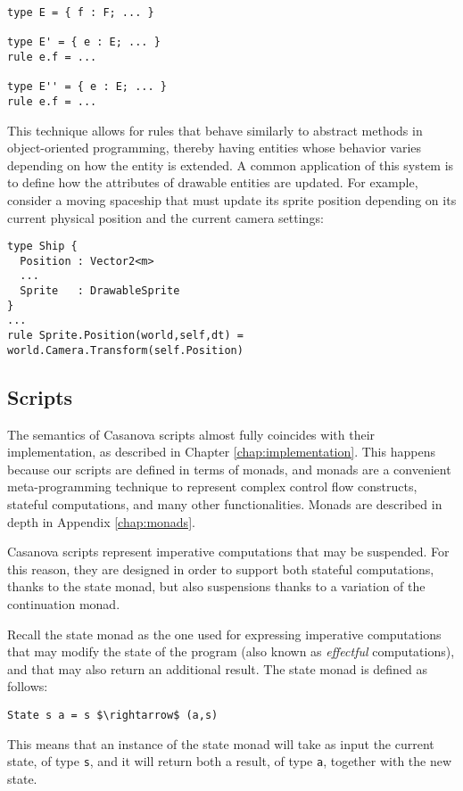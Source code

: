 \begin{lstlisting}
type E = { f : F; ... }

type E' = { e : E; ... }
rule e.f = ...

type E'' = { e : E; ... }
rule e.f = ...
\end{lstlisting}

This technique allows for rules that behave similarly to abstract methods in object-oriented programming, thereby having entities whose behavior varies depending on how the entity is extended. A common application of this system is to define how the attributes of drawable entities are updated. For example, consider a moving spaceship that must update its sprite position depending on its current physical position and the current camera settings:

\begin{lstlisting}
type Ship {
  Position : Vector2<m>
  ...
  Sprite   : DrawableSprite
}
...
rule Sprite.Position(world,self,dt) = world.Camera.Transform(self.Position)
\end{lstlisting}

\subsection{Scripts}
The semantics of Casanova scripts almost fully coincides with their implementation, as described in Chapter \ref{chap:implementation}. This happens because our scripts are defined in terms of monads, and monads are a convenient meta-programming technique to represent complex control flow constructs, stateful computations, and many other functionalities. Monads are described in depth in Appendix \ref{chap:monads}.

Casanova scripts represent imperative computations that may be suspended. For this reason, they are designed in order to support both stateful computations, thanks to the state monad, but also suspensions thanks to a variation of the continuation monad.

Recall the state monad as the one used for expressing imperative computations that may modify the state of the program (also known as \textit{effectful} computations), and that may also return an additional result. The state monad is defined as follows:

\begin{lstlisting}
State s a = s $\rightarrow$ (a,s)
\end{lstlisting}

This means that an instance of the state monad will take as input the current state, of type \texttt{s}, and it will return both a result, of type \texttt{a}, together with the new state.

